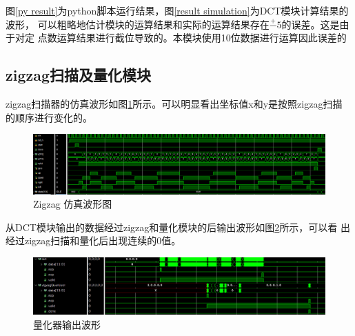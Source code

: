 \documentclass{article}
\numberwithin {equation}{section}
\begin{document}
\begin{spacing}{1.25}
    图\ref{py result}为python脚本运行结果，图\ref{result simulation}为DCT模块计算结果的波形，
    可以粗略地估计模块的运算结果和实际的运算结果存在$\stackrel{+}{-}5$的误差。这是由于对定
    点数运算结果进行截位导致的。本模块使用10位数据进行运算因此误差的
  \subsection{zigzag扫描及量化模块}
    \vspace{1em}
    zigzag扫描器的仿真波形如图\ref{scannerWave}所示。可以明显看出坐标值x和y是按照zigzag扫描
    的顺序进行变化的。
      \begin{figure}[H]
        \centering
        \includegraphics[scale=0.4]{./pictures/scannerWave.png}
        \caption{Zigzag 仿真波形图}
        \label{scannerWave}
      \end{figure}

    从DCT模块输出的数据经过zigzag和量化模块的后输出波形如图\ref{quantizer wave}所示，可以看
    出经过zigzag扫描和量化后出现连续的0值。
    \begin{figure}[H]
      \centering
      \includegraphics[scale=0.32]{./pictures/quantizer_wave.png}
      \caption{量化器输出波形}
      \label{quantizer wave}
    \end{figure}

\end{spacing}
\end{document}
